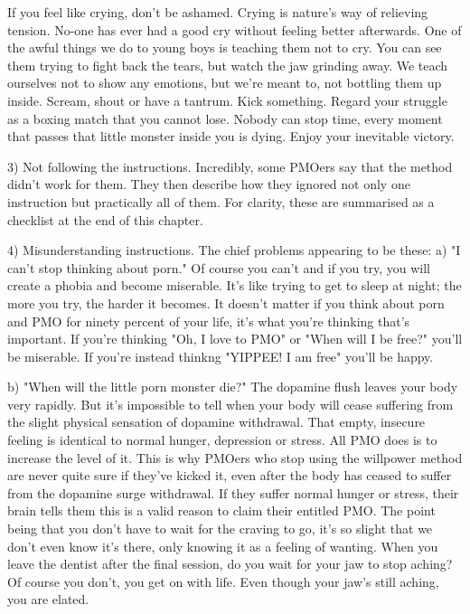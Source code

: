   If you feel like crying, don't be ashamed. Crying is nature's way of relieving tension. No-one has ever had a good cry without feeling better afterwards. One of the awful things we do to young boys is teaching them not to cry. You can see them trying to fight back the tears, but watch the jaw grinding away. We teach ourselves not to show any emotions, but we're meant to, not bottling them up inside. Scream, shout or have a tantrum. Kick something. Regard your struggle as a boxing match that you cannot lose. Nobody can stop time, every moment that passes that little monster inside you is dying. Enjoy your inevitable victory. 

  3) Not following the instructions. Incredibly, some PMOers say that the method didn't work for them. They then describe how they ignored not only one instruction but practically all of them. For clarity, these are summarised as a checklist at the end of this chapter.

  4) Misunderstanding instructions. The chief problems appearing to be these:
    a) "I can't stop thinking about porn."
      Of course you can't and if you try, you will create a phobia and become miserable. It's like trying to get to sleep at night; the more you try, the harder it becomes. It doesn't matter if you think about porn and PMO for ninety percent of your life, it's what you're thinking that's important. If you're thinking "Oh, I love to PMO" or "When will I be free?" you'll be miserable. If you're instead thinkng "YIPPEE! I am free" you'll be happy.

      b) "When will the little porn monster die?"
        The dopamine flush leaves your body very rapidly. But it's impossible to tell when your body will cease suffering from the slight physical sensation of dopamine withdrawal. That empty, insecure feeling is identical to normal hunger, depression or stress. All PMO does is to increase the level of it. This is why PMOers who stop using the willpower method are never quite sure if they've kicked it, even after the body has ceased to suffer from the dopamine surge withdrawal. If they suffer normal hunger or stress, their brain tells them this is a valid reason to claim their entitled PMO. The point being that you don't have to wait for the craving to go, it's so slight that we don't even know it's there, only knowing it as a feeling of wanting. When you leave the dentist after the final session, do you wait for your jaw to stop aching? Of course you don't, you get on with life. Even though your jaw's still aching, you are elated.

